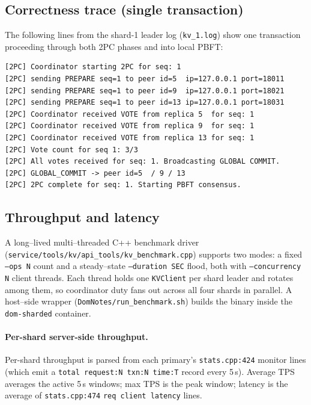 \documentclass[11pt]{article}
\begin{document}
\subsection{Correctness trace (single transaction)}

The following lines from the shard-1 leader log
(\texttt{kv\_1.log}) show one transaction proceeding through both 2PC phases
and into local PBFT:

\begin{lstlisting}[style=shstyle,caption={Annotated coordinator log for one transaction.}]
[2PC] Coordinator starting 2PC for seq: 1
[2PC] sending PREPARE seq=1 to peer id=5  ip=127.0.0.1 port=18011
[2PC] sending PREPARE seq=1 to peer id=9  ip=127.0.0.1 port=18021
[2PC] sending PREPARE seq=1 to peer id=13 ip=127.0.0.1 port=18031
[2PC] Coordinator received VOTE from replica 5  for seq: 1
[2PC] Coordinator received VOTE from replica 9  for seq: 1
[2PC] Coordinator received VOTE from replica 13 for seq: 1
[2PC] Vote count for seq 1: 3/3
[2PC] All votes received for seq: 1. Broadcasting GLOBAL COMMIT.
[2PC] GLOBAL_COMMIT -> peer id=5  / 9 / 13
[2PC] 2PC complete for seq: 1. Starting PBFT consensus.
\end{lstlisting}

\subsection{Throughput and latency}

A long--lived multi--threaded C++ benchmark driver
(\texttt{service/tools/kv/api\_tools/kv\_benchmark.cpp}) supports two
modes: a fixed \texttt{--ops N} count and a steady--state
\texttt{--duration SEC} flood, both with \texttt{--concurrency N}
client threads. Each thread holds one \texttt{KVClient} per shard
leader and rotates among them, so coordinator duty fans out across
all four shards in parallel. A host--side wrapper
(\texttt{DomNotes/run\_benchmark.sh}) builds the binary inside the
\texttt{dom-sharded} container.

\paragraph{Per-shard server-side throughput.} Per-shard
throughput is parsed from each primary's \texttt{stats.cpp:424}
monitor lines (which emit a \texttt{total request:N txn:N time:T}
record every 5\,s). Average TPS averages the active 5\,s windows;
max TPS is the peak window; latency is the average of
\texttt{stats.cpp:474} \texttt{req client latency} lines.
\end{document}
